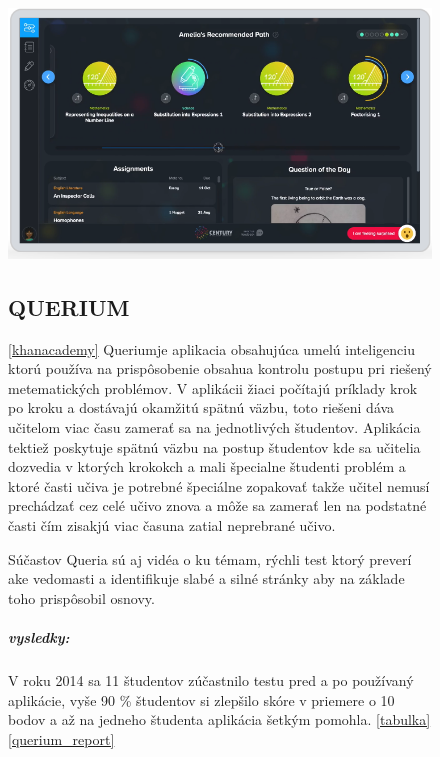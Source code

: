 \documentclass[10pt,oneside,slovak,a4paper]{article}
\begin{document}
\begin{figure}[h!]
	\includegraphics[width=0.7\linewidth]{obrazky/artificial-intelligence-applications-edtech-century-tech}
	\caption{}
	\label{fig:artificial-intelligence-applications-edtech-century-tech}


\subsection{QUERIUM}
\ref{khanacademy}
Queriumje aplikacia obsahujúca umelú inteligenciu ktorú používa na prispôsobenie obsahua kontrolu postupu pri riešený metematických problémov. V aplikácii žiaci počítajú príklady krok po kroku a dostávajú okamžitú spätnú väzbu, toto riešeni dáva učitelom viac času zamerať sa na jednotlivých študentov. Aplikácia tektiež poskytuje spätnú väzbu na postup študentov kde sa učitelia dozvedia v ktorých krokokch a mali špecialne študenti problém a ktoré časti učiva je potrebné špeciálne zopakovať takže učitel nemusí prechádzať cez celé učivo znova a môže sa zamerať len na podstatné časti čím zisakjú viac časuna zatial neprebrané učivo.

Súčastov Queria sú aj vidéa o ku témam, rýchli test ktorý preverí ake vedomasti a identifikuje slabé a silné stránky aby na základe toho prispôsobil osnovy.



\subparagraph{vysledky:}
V roku 2014 sa 11 študentov zúčastnilo testu pred a po používaný aplikácie, vyše 90 \% študentov si zlepšilo skóre v priemere o 10 bodov a až na jedneho študenta aplikácia šetkým pomohla. \ref{tabulka} \ref{querium_report}

\end{figure}
\label{tabulka}
\mydata
\end{document}
